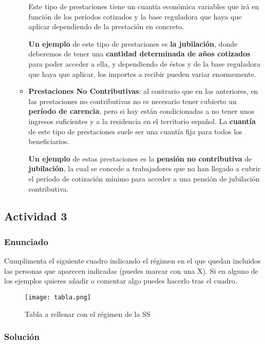 \begin{enumerate}[label=\alph*)]
\begin{itemize}
        Este tipo de prestaciones tiene un cuantía económica variables que irá en función de los períodos cotizados y la base reguladora que haya que aplicar dependiendo de la prestación en concreto.

        \textbf{Un ejemplo} de este tipo de prestaciones es \textbf{la jubilación}, donde deberemos de tener una \textbf{cantidad determinada de años cotizados} para poder acceder a ella, y dependiendo de éstos y de la base reguladora que haya que aplicar, los importes a recibir pueden variar enormemente.

        \item \textbf{Prestaciones No Contributivas}: al contrario que en las anteriores, en las prestaciones no contributivas no es necesario tener cubierto un \textbf{período de carencia}, pero si hay están condicionadas a no tener unos ingresos suficientes y a la residencia en el territorio español. La \textbf{cuantía} de este tipo de prestaciones suele ser una cuantía fija para todos los beneficiarios.

        \textbf{Un ejemplo} de estas prestaciones es la \textbf{pensión no contributiva} de \textbf{jubilación}, la cual se concede a trabajadores que no han llegado a cubrir el período de cotización mínimo para acceder a una pensión de jubilación contributiva.
    \end{itemize}
\end{enumerate}

\subsection{Actividad 3}

\subsubsection{Enunciado}
Cumplimenta el siguiente cuadro indicando el régimen  en el que quedan incluidos las personas que aparecen indicadas (puedes marcar con una X). Si en alguno de los ejemplos quieres añadir o comentar algo puedes hacerlo tras el cuadro.

\begin{figure}[H]
    \centering
    \texttt{[image: tabla.png]}
    \caption{Tabla a rellenar con el régimen de la SS}
\end{figure}

\subsubsection{Solución}

